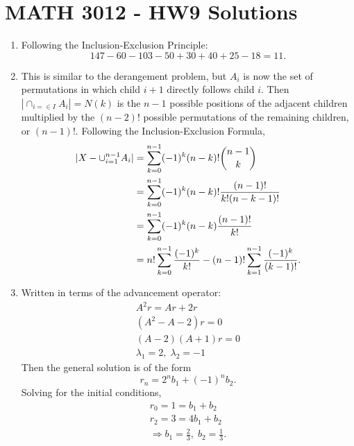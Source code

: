 \documentclass[a4paper,12pt]{article}
\begin{document}
\section*{MATH 3012 - HW9 Solutions}

\begin{enumerate}
	\item Following the Inclusion-Exclusion Principle:
	\[ 147 - 60 - 103 - 50 + 30 + 40 + 25 - 18 = 11. \]
	
	\item This is similar to the derangement problem, but $A_i$ is now the set of permutations in which child $i + 1$ directly follows child $i$. Then $|\cap_{i = \in I}A_i| = N(k)$ is the $n - 1$ possible positions of the adjacent children multiplied by the $(n - 2)!$ possible permutations of the remaining children, or $(n - 1)!$. Following the Inclusion-Exclusion Formula,
	\begin{align*}
	|X - \cup_{i = 1}^{n - 1}A_i| &= \sum_{k = 0}^{n - 1}(-1)^k(n - k)!\dbinom{n - 1}{k} \\
	&= \sum_{k = 0}^{n - 1}(-1)^k(n - k)!\frac{(n - 1)!}{k!(n - k - 1)!} \\
	&= \sum_{k = 0}^{n - 1}(-1)^k(n - k)\frac{(n - 1)!}{k!} \\
	&= n!\sum_{k = 0}^{n - 1}\frac{(-1)^k}{k!} - (n - 1)!\sum_{k = 1}^{n - 1}\frac{(-1)^k}{(k - 1)!}.
	\end{align*}
	
	\item Written in terms of the advancement operator:
	\begin{gather*}
	A^2 r = Ar + 2r \\
	(A^2 - A - 2)r = 0 \\
	(A - 2)(A + 1)r = 0 \\
	\lambda_1 = 2, \; \lambda_2 = -1
	\end{gather*}
	Then the general solution is of the form
	\[ r_n = 2^nb_1 + (-1)^nb_2. \]
	Solving for the initial conditions,
	\begin{gather*}
	r_0 = 1 = b_1 + b_2 \\
	r_2 = 3 = 4b_1 + b_2 \\
	\Rightarrow b_1 = \frac{2}{3}, \; b_2 = \frac{1}{3}.
	\end{gather*}
	

\end{enumerate}
\end{document}
